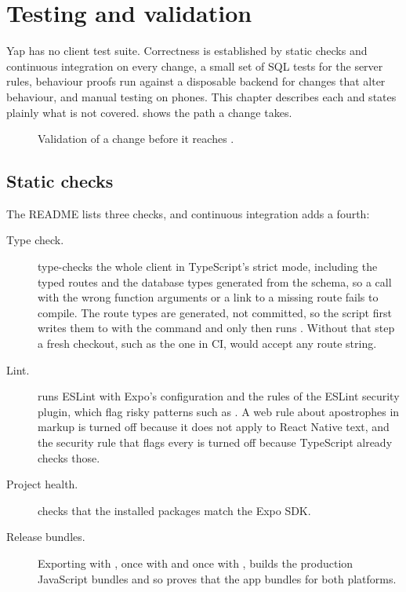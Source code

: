 \chapter{Testing and validation}
\label{ch:testing}

Yap has no client test suite. Correctness is established by static checks and continuous integration on
every change, a small set of SQL tests for the server rules, behaviour proofs run against a disposable
backend for changes that alter behaviour, and manual testing on phones. This chapter describes
each and states plainly what is not covered.  shows the path a change takes.

\begin{figure}[ht]
  \centering
  
  \caption{Validation of a change before it reaches .}
  \label{fig:validation}
\end{figure}

\section{Static checks}

The README lists three checks, and continuous integration adds a fourth:

\begin{description}
  \item[Type check.]  type-checks the whole client in TypeScript's strict mode,
    including the typed routes and the database types generated from the schema, so a call with the wrong
    function arguments or a link to a missing route fails to compile. The route types are generated, not
    committed, so the script first writes them to  with the command
     and only then runs . Without that step a fresh
    checkout, such as the one in CI, would accept any route string.
  \item[Lint.]  runs ESLint with Expo's configuration and the rules of the ESLint
    security plugin, which flag risky patterns such as . A web rule about apostrophes in markup is turned off because it
    does not apply to React Native text, and the security rule that flags every  is
    turned off because TypeScript already checks those.
  \item[Project health.]  checks that the installed packages match the Expo SDK.
  \item[Release bundles.] Exporting with , once with  and once
    with , builds the production JavaScript bundles and so proves that the app
    bundles for both platforms.
\end{description}

